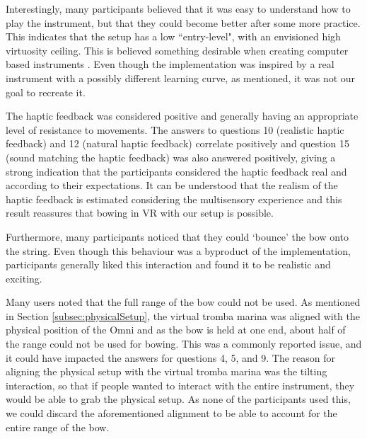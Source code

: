 Interestingly, many participants believed that it was easy to understand how to play the instrument, but that they could become better after some more practice. %
This indicates that the setup has a low ``entry-level", with an envisioned high virtuosity ceiling. This is believed something desirable when creating computer based instruments \cite{Wessel2002}. Even though the implementation was inspired by a real instrument with a possibly different learning curve, as mentioned, it was not our goal to recreate it.  

The haptic feedback was considered positive and generally having an appropriate level of resistance to movements. The answers to questions 10 (realistic haptic feedback) and 12 (natural haptic feedback) correlate positively and question 15 (sound matching the haptic feedback) was also answered positively, giving a strong indication that the participants considered the haptic feedback real and according to their expectations.  It can be understood that the realism of the haptic feedback is estimated considering the multisensory experience and this result reassures that bowing in VR with our setup is possible.

Furthermore, many participants noticed that they could `bounce' the bow onto the string. Even though this behaviour was a byproduct of the implementation, participants generally liked this interaction and found it to be realistic and exciting.  

Many users noted that the full range of the bow could not be used. As mentioned in Section \ref{subsec:physicalSetup}, the virtual tromba marina was aligned with the physical position of the Omni and as the bow is held at one end, about half of the range could not be used for bowing. This was a commonly reported issue, and it could have impacted the answers for questions 4, 5, and 9. The reason for aligning the physical setup with the virtual tromba marina was the tilting interaction, so that if people wanted to interact with the entire instrument, they would be able to grab the physical setup. As none of the participants used this, we could discard the aforementioned alignment to be able to account for the entire range of the bow. %

